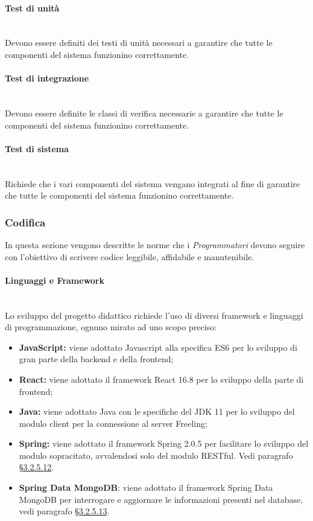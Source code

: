 \paragraph{Test di unità}\mbox{}\\
Devono essere definiti dei testi di unità necessari a garantire che tutte le componenti del sistema funzionino correttamente.

\paragraph{Test di integrazione}\mbox{}\\
Devono essere definite le classi di verifica necessarie a garantire che tutte le componenti del sistema funzionino correttamente.

\paragraph{Test di sistema}\mbox{}\\
Richiede che i vari componenti del sistema vengano integrati al fine di garantire che tutte le componenti del sistema funzionino correttamente.

\subsubsection{Codifica}
In questa sezione vengono descritte le norme che i \textit{Programmatori} devono seguire con l'obiettivo di scrivere codice leggibile, affidabile e manutenibile.

\paragraph{Linguaggi e Framework}\mbox{}\\
Lo sviluppo del progetto didattico richiede l'uso di diversi framework e linguaggi di programmazione, ognuno mirato ad uno scopo preciso:
\begin{itemize}
	\item \textbf{JavaScript:} viene adottato Javascript alla specifica ES6 per lo sviluppo di gran parte della backend e della frontend;
	\item \textbf{React:} viene adottato il framework React 16.8 per lo sviluppo della parte di frontend;
	\item \textbf{Java:} viene adottato Java con le specifiche del JDK 11 per lo sviluppo del modulo client per la connessione al server Freeling;
	\item \textbf{Spring:} viene adottato il framework Spring 2.0.5 per facilitare lo sviluppo del modulo sopracitato, avvalendosi solo del modulo RESTful. Vedi paragrafo \hyperref[sec:Spring]{§3.2.5.12}.
	\item \textbf{Spring Data MongoDB}: viene adottato il framework Spring Data MongoDB per interrogare e aggiornare le informazioni presenti nel database, vedi paragrafo \hyperref[sec:DataMongoDB]{§3.2.5.13}.
\end{itemize}


